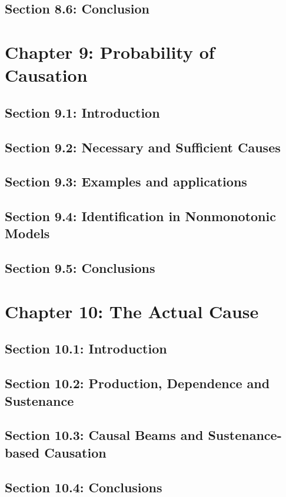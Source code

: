 \documentclass[oneside]{book}
\begin{document}


\section{Section 8.6: Conclusion}



\chapter{Chapter 9: Probability of Causation}

\section{Section 9.1: Introduction}



\section{Section 9.2: Necessary and Sufficient Causes}



\section{Section 9.3: Examples and applications}



\section{Section 9.4: Identification in Nonmonotonic Models}



\section{Section 9.5: Conclusions}



\chapter{Chapter 10: The Actual Cause}

\section{Section 10.1: Introduction}



\section{Section 10.2: Production, Dependence and Sustenance}



\section{Section 10.3: Causal Beams and Sustenance-based Causation}



\section{Section 10.4: Conclusions}


\end{document}
